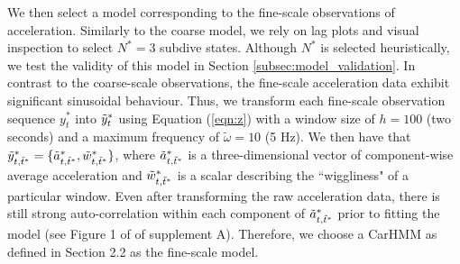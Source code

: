 We then select a model corresponding to the fine-scale observations of acceleration. Similarly to the coarse model, we rely on lag plots and visual inspection to select $N^*=3$ subdive states. Although $N^*$ is selected heuristically, we test the validity of this model in Section \ref{subsec:model_validation}.
%
In contrast to the coarse-scale observations, the fine-scale acceleration data exhibit significant sinusoidal behaviour. Thus, we transform each fine-scale observation sequence $y_t^*$ into $\tilde{y}^*_t$ using Equation (\ref{eqn:z}) with a window size of $h=100$ (two seconds) and a maximum frequency of $\tilde{\omega}=10$ (5 Hz). 
We then have that $\tilde{y}^*_{t,\tilde t^*} = \{\tilde{a}^*_{t,\tilde t^*},\tilde{w}^*_{t,\tilde t^*}\}$, where $\tilde{a}^*_{t,\tilde t^*}$ is a three-dimensional vector of component-wise average acceleration and $\tilde{w}^*_{t,\tilde t^*}$ is a scalar describing the ``wiggliness" of a particular window. Even after transforming the raw acceleration data, there is still strong auto-correlation within each component of $\tilde{a}^*_{t,\tilde t^*}$ prior to fitting the model (see Figure 1 of of supplement A). Therefore, we choose a CarHMM as defined in Section 2.2 as the fine-scale model.

